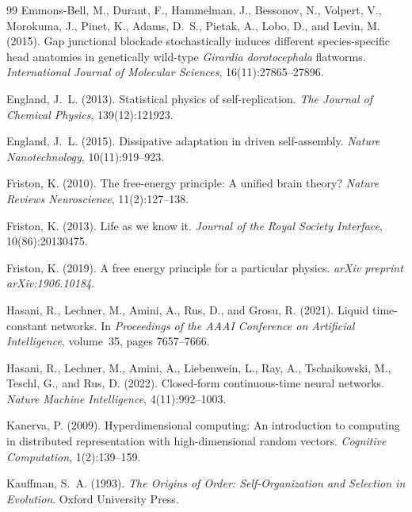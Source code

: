 \documentclass[12pt,a4paper]{article}
\begin{document}
\begin{thebibliography}{99}
Emmons-Bell, M., Durant, F., Hammelman, J., Bessonov, N., Volpert, V.,
  Morokuma, J., Pinet, K., Adams, D.~S., Pietak, A., Lobo, D., and
  Levin, M. (2015).
\newblock Gap junctional blockade stochastically induces different
  species-specific head anatomies in genetically wild-type
  \emph{Girardia dorotocephala} flatworms.
\newblock \emph{International Journal of Molecular Sciences},
  16(11):27865--27896.

England, J.~L. (2013).
\newblock Statistical physics of self-replication.
\newblock \emph{The Journal of Chemical Physics}, 139(12):121923.

England, J.~L. (2015).
\newblock Dissipative adaptation in driven self-assembly.
\newblock \emph{Nature Nanotechnology}, 10(11):919--923.

Friston, K. (2010).
\newblock The free-energy principle: A unified brain theory?
\newblock \emph{Nature Reviews Neuroscience}, 11(2):127--138.

Friston, K. (2013).
\newblock Life as we know it.
\newblock \emph{Journal of the Royal Society Interface},
  10(86):20130475.

Friston, K. (2019).
\newblock A free energy principle for a particular physics.
\newblock \emph{arXiv preprint arXiv:1906.10184}.

Hasani, R., Lechner, M., Amini, A., Rus, D., and Grosu, R. (2021).
\newblock Liquid time-constant networks.
\newblock In \emph{Proceedings of the AAAI Conference on Artificial
  Intelligence}, volume~35, pages 7657--7666.

Hasani, R., Lechner, M., Amini, A., Liebenwein, L., Ray, A., Tschaikowski,
  M., Teschl, G., and Rus, D. (2022).
\newblock Closed-form continuous-time neural networks.
\newblock \emph{Nature Machine Intelligence}, 4(11):992--1003.

Kanerva, P. (2009).
\newblock Hyperdimensional computing: An introduction to computing in
  distributed representation with high-dimensional random vectors.
\newblock \emph{Cognitive Computation}, 1(2):139--159.

Kauffman, S.~A. (1993).
\newblock \emph{The Origins of Order: Self-Organization and Selection in
  Evolution}.
\newblock Oxford University Press.


\end{thebibliography}
\end{document}
